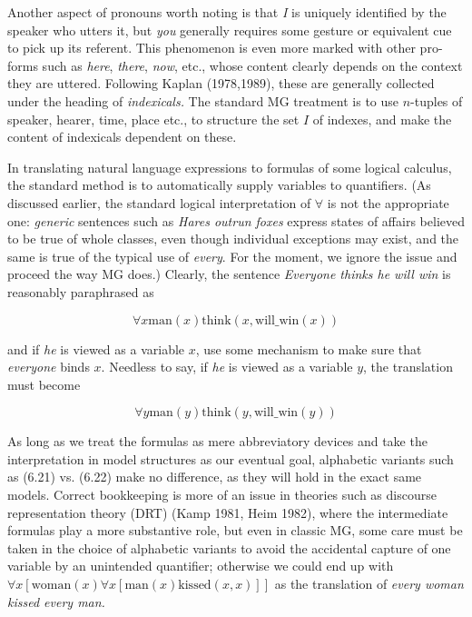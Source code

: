 Another aspect of pronouns worth noting is that {\it I} is uniquely identified
by the speaker who utters it, but {\it you} generally requires some gesture or
equivalent cue to pick up its referent. This phenomenon is even more marked
with other pro-forms such as {\it here}, {\it there}, {\it now}, etc., whose
content clearly depends on the context they are uttered. Following Kaplan
(1978,1989), these are generally collected under the heading of {\it
  indexicals.} \nocite{Kaplan:1978} \nocite{Kaplan:1989} The
standard MG treatment is to use $n$-tuples of speaker, hearer, time, place
etc., to structure the set $I$ of indexes, and make the content of indexicals
dependent on these.

In translating natural language expressions to formulas of some logical
calculus, the standard method is to automatically supply variables to
quantifiers. (As discussed earlier, the standard logical interpretation of
$\forall$ is not the appropriate one: {\it generic} sentences such as {\it Hares
  outrun foxes} express states of affairs believed to be true of whole
classes, even though individual exceptions may exist, and the same is true of
the typical use of {\it every}. For the moment, we ignore the issue and
proceed the way MG does.)  Clearly, the sentence {\it Everyone thinks he will
  win} is reasonably paraphrased as

\begin{equation}
\forall x \text{man}(x) \text{think}(x, \text{will$\_$win}(x))
\end{equation}

\smallskip\noindent and if {\it he} is viewed as a variable $x$, use some
mechanism to make sure that {\it everyone} binds $x$. Needless to say, if {\it
  he} is viewed as a variable $y$, the translation must become

\begin{equation}
\forall y \text{man}(y) \text{think}(y,\text{will$\_$win}(y))
\end{equation}

\smallskip
\noindent
As long as we treat the formulas as mere abbreviatory devices and take the
interpretation in model structures as our eventual goal, alphabetic variants
such as (6.21) vs. (6.22) make no difference, as they will hold in the exact
same models. Correct bookkeeping is more of an issue in theories such as
discourse representation theory (DRT)
(Kamp 1981, Heim 1982), where the\nocite{Kamp:1981}\nocite{Heim:1982}
intermediate formulas play a more substantive role, but even in classic MG,
some care must be taken in the choice of alphabetic variants to avoid the
accidental capture of one variable by an unintended quantifier; otherwise we
could end up with $\forall x [\text{woman}(x) \forall x [\text{man}(x)
    \text{kissed}(x,x)]]$ as the translation of {\it every woman kissed every
  man.}

